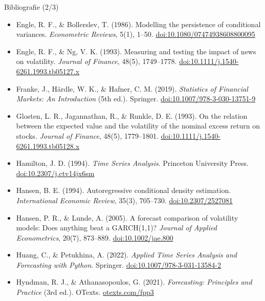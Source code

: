 \begin{frame}{Bibliografie (2/3)}
\itemsize{\scriptsize}
\begin{itemize}
    \item Engle, R. F., \& Bollerslev, T. (1986). Modelling the persistence of conditional variances. \textit{Econometric Reviews}, 5(1), 1--50. \href{https://doi.org/10.1080/07474938608800095}{doi:10.1080/07474938608800095}
    \item Engle, R. F., \& Ng, V. K. (1993). Measuring and testing the impact of news on volatility. \textit{Journal of Finance}, 48(5), 1749--1778. \href{https://doi.org/10.1111/j.1540-6261.1993.tb05127.x}{doi:10.1111/j.1540-6261.1993.tb05127.x}
    \item Franke, J., Härdle, W. K., \& Hafner, C. M. (2019). \textit{Statistics of Financial Markets: An Introduction} (5th ed.). Springer. \href{https://doi.org/10.1007/978-3-030-13751-9}{doi:10.1007/978-3-030-13751-9}
    \item Glosten, L. R., Jagannathan, R., \& Runkle, D. E. (1993). On the relation between the expected value and the volatility of the nominal excess return on stocks. \textit{Journal of Finance}, 48(5), 1779--1801. \href{https://doi.org/10.1111/j.1540-6261.1993.tb05128.x}{doi:10.1111/j.1540-6261.1993.tb05128.x}
    \item Hamilton, J. D. (1994). \textit{Time Series Analysis}. Princeton University Press. \href{https://doi.org/10.2307/j.ctv14jx6sm}{doi:10.2307/j.ctv14jx6sm}
    \item Hansen, B. E. (1994). Autoregressive conditional density estimation. \textit{International Economic Review}, 35(3), 705--730. \href{https://doi.org/10.2307/2527081}{doi:10.2307/2527081}
    \item Hansen, P. R., \& Lunde, A. (2005). A forecast comparison of volatility models: Does anything beat a GARCH(1,1)? \textit{Journal of Applied Econometrics}, 20(7), 873--889. \href{https://doi.org/10.1002/jae.800}{doi:10.1002/jae.800}
    \item Huang, C., \& Petukhina, A. (2022). \textit{Applied Time Series Analysis and Forecasting with Python}. Springer. \href{https://doi.org/10.1007/978-3-031-13584-2}{doi:10.1007/978-3-031-13584-2}
    \item Hyndman, R. J., \& Athanasopoulos, G. (2021). \textit{Forecasting: Principles and Practice} (3rd ed.). OTexts. \href{https://otexts.com/fpp3/}{otexts.com/fpp3}
\end{itemize}
\end{frame}

